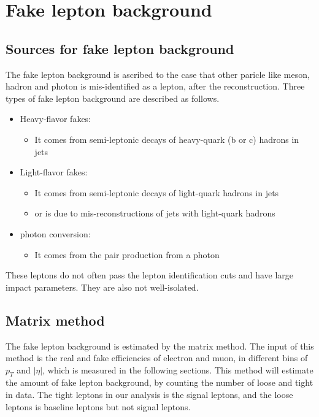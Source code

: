 \section{Fake lepton background}
\label{sec:fake_background}
\subsection{Sources for fake lepton background}
The fake lepton background is ascribed to the case that other paricle like meson, hadron and photon is mis-identified as a lepton, after the reconstruction.
Three types of fake lepton background are described as follows.
\begin{itemize}
\item Heavy-flavor fakes:
\begin{itemize}
\item It comes from semi-leptonic decays of heavy-quark (b or c) hadrons in jets
\end{itemize}
\item Light-flavor fakes:
\begin{itemize}
\item It comes from semi-leptonic decays of light-quark hadrons in jets
\item or is due to mis-reconstructions of jets with light-quark hadrons
\end{itemize}
\item photon conversion:
\begin{itemize}
\item It comes from the pair production from a photon
\end{itemize}
\end{itemize}
These leptons do not often pass the lepton identification cuts and have large impact parameters.
They are also not well-isolated.

\subsection{Matrix method}
The fake lepton background is estimated by the matrix method.
The input of this method is the real and fake efficiencies of electron and muon, in different bins of $p_T$ and $|\eta|$, which is measured in the following sections.
This method will estimate the amount of fake lepton background, by counting the number of loose and tight in data.
The tight leptons in our analysis is the signal leptons, and the loose leptons is baseline leptons but not signal leptons.

